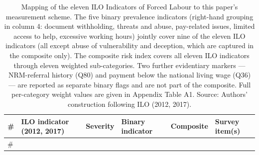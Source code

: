 \documentclass[
  12pt,
  letterpaper,
  DIV=11,
  numbers=noendperiod]{scrartcl}
\begin{document}
\begin{longtable}[]{@{}
  >{\raggedleft\arraybackslash}p{}
  >{\raggedright\arraybackslash}p{}
  >{\centering\arraybackslash}p{}
  >{\raggedright\arraybackslash}p{}
  >{\centering\arraybackslash}p{}
  >{\raggedright\arraybackslash}p{}@{}}
\caption{Mapping of the eleven ILO Indicators of Forced Labour to this
paper's measurement scheme. The five binary prevalence indicators
(right-hand grouping in column 4: document withholding, threats and
abuse, pay-related issues, limited access to help, excessive working
hours) jointly cover nine of the eleven ILO indicators (all except abuse
of vulnerability and deception, which are captured in the composite
only). The composite risk index covers all eleven ILO indicators through
eleven weighted sub-categories. Two further evidentiary markers ---
NRM-referral history (Q80) and payment below the national living wage
(Q36) --- are reported as separate binary flags and are not part of the
composite. Full per-category weight values are given in Appendix Table
A1. Source: Authors' construction following ILO (2012,
2017).}\label{tbl-indicator-mapping}\tabularnewline
\toprule\noalign{}
\begin{minipage}[b]{\linewidth}\raggedleft
\#
\end{minipage} & \begin{minipage}[b]{\linewidth}\raggedright
ILO indicator (2012, 2017)
\end{minipage} & \begin{minipage}[b]{\linewidth}\centering
Severity
\end{minipage} & \begin{minipage}[b]{\linewidth}\raggedright
Binary indicator
\end{minipage} & \begin{minipage}[b]{\linewidth}\centering
Composite
\end{minipage} & \begin{minipage}[b]{\linewidth}\raggedright
Survey item(s)
\end{minipage} \\
\midrule\noalign{}
\endfirsthead
\toprule\noalign{}
\begin{minipage}[b]{\linewidth}\raggedleft
\#
\end{minipage} & \begin{minipage}[b]{\linewidth}\raggedright

\end{minipage}
\end{longtable}
\end{document}
